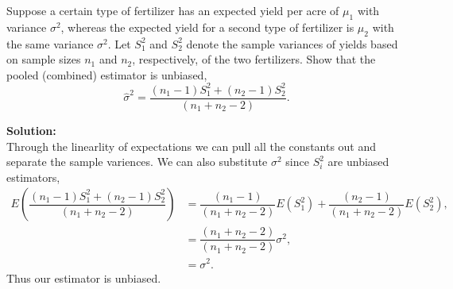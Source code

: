 \documentclass[12pt]{article}
\makeatletter
\theoremstyle{homework}
\newenvironment{exercise}[1]
{\def\@currentlabel{#1}\exercisecore}
{\endexercisecore}
\newcommand{\localhead}[1]{\par\smallskip\noindent\textbf{#1}\nobreak\\}%
\newcommand\solution{\localhead{Solution:}}
\makeatother
\begin{document}
\begin{exercise}{6.12} Suppose a certain type of fertilizer has an expected yield per  acre  of  $\mu_1$  with
    variance  $\sigma^2$,  whereas  the  expected  yield  for  a  second  type  of  fertilizer  is  $\mu_2$  with  the 
    same  variance $\sigma^2$. Let $S^2_1$ and $S^2_2$ denote the sample variances of yields based on sample sizes $n_1$ and $n_2$, 
    respectively, of the two fertilizers. Show that the pooled (combined) estimator is unbiased,
    \begin{equation*}
      \hat{\sigma}^2 = \dfrac{(n_1 - 1)S^2_1 + (n_2 - 1)S^2_2}{(n_1 + n_2 - 2)}.
    \end{equation*}
    \solution Through the linearlity of expectations we can pull all the constants out and separate the sample variences. 
    We can also substitute $\sigma^2$ since $S^2_i$ are unbiased estimators,
    \begin{align*}
      E(\dfrac{(n_1 - 1)S^2_1 + (n_2 - 1)S^2_2}{(n_1 + n_2 - 2)}) &= \dfrac{(n_1 - 1)}{(n_1 + n_2 - 2)}E(S^2_1) + \dfrac{(n_2 - 1)}{(n_1 + n_2 - 2)}E(S^2_2),\\
      &= \dfrac{(n_1 + n_2 - 2)}{(n_1 + n_2 - 2)}\sigma^2,\\
      &= \sigma^2.
    \end{align*}
    Thus our estimator is unbiased. 
\end{exercise}
\end{document}
